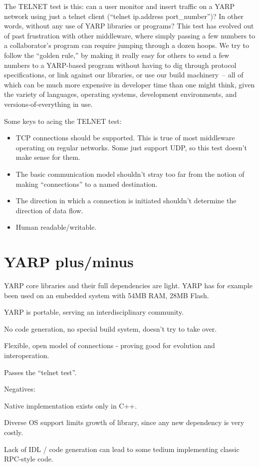 \documentclass[letterpaper]{article}
\begin{document}
The TELNET test is this: can a user monitor and insert traffic on a
YARP network using just a telnet client (``telnet ip.address
port\_number'')?  In other words, without any use of YARP libraries or
programs?  This test has evolved out of past frustration with other
middleware, where simply passing a few numbers to a collaborator's
program can require jumping through a dozen hoops.  We try to follow
the ``golden rule,'' by making it really easy for others to send a few
numbers to a YARP-based program without having to dig through protocol
specifications, or link against our libraries, or use our build
machinery~-- all of which can be much more expensive in developer time
than one might think, given the variety of languages, operating
systems, development environments, and versions-of-everything in use.

Some keys to acing the TELNET test:

\begin{itemize}

\item TCP connections should be supported.  
  This is true of most middleware operating on regular
  networks. Some just support UDP, so this test doesn't
  make sense for them.

\item The basic communication model shouldn't stray too far from the
  notion of making ``connections'' to a named destination.

\item The direction in which a connection is initiated shouldn't
  determine the direction of data flow.

\item Human readable/writable.

\end{itemize}


\section{YARP plus/minus}

YARP core libraries and their full dependencies are light.
YARP has for example been used on an embedded system
with 54MB RAM, 28MB Flash.

YARP is portable, serving an interdisciplinary community.

No code generation, no special build system, doesn't try to take over.

Flexible, open model of connections - proving good for evolution and interoperation.

Passes the ``telnet test''.

Negatives:

Native implementation exists only in C++.  

Diverse OS support limits growth of library, since any
new dependency is very costly.

Lack of IDL / code generation can lead to some tedium
implementing classic RPC-style code.




\end{document}
